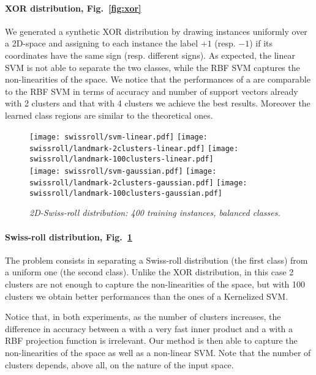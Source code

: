 \paragraph{XOR distribution, Fig.~\ref{fig:xor}} We generated a synthetic XOR distribution by drawing instances uniformly over a 2D-space and assigning to each instance the label $+1$ (resp. $-1$) if its coordinates have the same sign (resp. different signs). As expected, the linear SVM is not able to separate the two classes, while the RBF SVM captures the non-linearities of the space. We notice that the performances of a \landSVM are comparable to the RBF SVM in terms of accuracy and number of support vectors already with 2 clusters and that with 4 clusters we achieve the best results. Moreover the learned class regions are similar to the theoretical ones.

\begin{figure}[h!]
  \centering
    \texttt{[image: swissroll/svm-linear.pdf]}
    \texttt{[image: swissroll/landmark-2clusters-linear.pdf]}
    \texttt{[image: swissroll/landmark-100clusters-linear.pdf]}\\
    \texttt{[image: swissroll/svm-gaussian.pdf]}    
    \texttt{[image: swissroll/landmark-2clusters-gaussian.pdf]}    
    \texttt{[image: swissroll/landmark-100clusters-gaussian.pdf]}\\
  \caption{\it{2D-Swiss-roll distribution}: 400 training instances, balanced classes.}
  \label{fig:swiss}
\end{figure}

\paragraph{Swiss-roll distribution, Fig.~\ref{fig:swiss}} The problem consists in separating a Swiss-roll distribution (the first class) from a uniform one (the second class). Unlike the XOR distribution, in this case 2 clusters are not enough to capture the non-linearities of the space, but with 100 clusters we obtain better performances than the ones of a Kernelized SVM. 

Notice that, in both experiments, as the number of clusters increases, the difference in accuracy between a \landSVM with a very fast inner product and a \landSVM with a RBF projection function is irrelevant.
Our method is then able to capture the non-linearities of the space as well as a non-linear SVM.
Note that the number of clusters depends, above all, on the nature of the input space.


